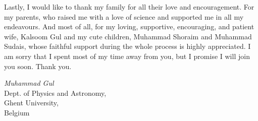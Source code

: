 \documentclass[10pt,a4paper,twoside,openright,dutch,english]{book}
\begin{document}
Lastly, I would like to thank my family for all their love and encouragement. For my parents, who raised me with a love of science and supported me in all my endeavours. And most of all, for my loving, supportive, encouraging, and patient wife, Kalsoom Gul and my cute children, Muhammad Shoraim and Muhammad Sudais, whose faithful support during the whole process is highly appreciated. I am sorry that I spent most of my time away from you, but I promise I will join you soon. Thank you. 


\begin{flushright}{\emph{Muhammad Gul}\\
Dept. of Physics and Astronomy,\\
Ghent University,\\
Belgium
}
\end{flushright}

\clearpage{\pagestyle{empty}\cleardoublepage}


\renewcommand{\contentsname}{Table of contents} %
\renewcommand\oddpageleftmark{{\scshape\small Table of contents}}
\tableofcontents
\clearpage{\pagestyle{empty}\cleardoublepage}


\renewcommand\oddpageleftmark{{\scshape\small List of acronyms}}


\clearpage      %
\thispagestyle{empty}   %


\renewcommand{\bibname}{References}     %

\end{document}

